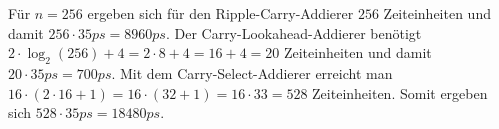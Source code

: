 \documentclass[10pt,a4paper,oneside,ngerman,numbers=noenddot]{scrartcl}
\begin{document}
Für $n=256$ ergeben sich für den Ripple-Carry-Addierer $256$ Zeiteinheiten und damit $256 \cdot 35ps=8960ps$. Der Carry-Lookahead-Addierer benötigt $2 \cdot \log_{2} (256) + 4 = 2 \cdot 8 + 4 = 16 + 4 = 20$ Zeiteinheiten und damit $20 \cdot 35ps=700ps$.
Mit dem Carry-Select-Addierer erreicht man $16 \cdot (2 \cdot 16 + 1) = 16 \cdot (32 + 1) = 16 \cdot 33 = 528$ Zeiteinheiten. Somit ergeben sich $528 \cdot 35ps=18480ps$.
\end{document}
